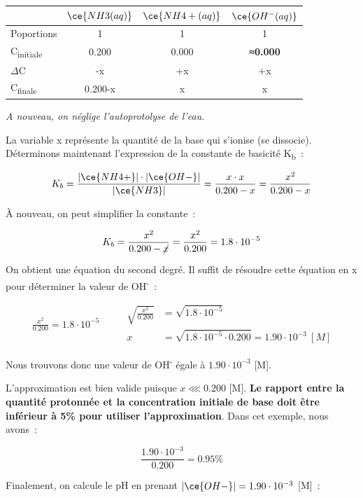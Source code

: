 \documentclass[
  11pt,
  a4paper,
  openany]{book}
\begin{document}
\begin{longtable}[]{@{}lccc@{}}
\toprule()
& \(\ce{NH3(aq)}\) & \(\ce{NH4+(aq)}\) & \(\ce{OH^{-}(aq)}\) \\
\midrule()
\endhead
Poportions & 1 & 1 & 1 \\
C\textsubscript{initiale} & 0.200 & 0.000 & \textbf{≈0.000} \\
\(\Delta\)C & -x & +x & +x \\
C\textsubscript{finale} & 0.200-x & x & x \\
\bottomrule()
\end{longtable}

\emph{A nouveau, on néglige l'autoprotolyse de l'eau.}

La variable x représente la quantité de la base qui s'ionise (se dissocie). Déterminons maintenant l'expression de la constante de basicité K\textsubscript{b}~:

\[
K_b = \frac{|\ce{NH4+}| \cdot |\ce{OH-}|}{|\ce{NH3}|} = \frac{x \cdot x}{0.200 - x} = \frac{x^2}{0.200 - x}
\]

À nouveau, on peut simplifier la constante~:

\[
K_b = \frac{x^2}{0.200 - \cancel{x}} = \frac{x^2}{0.200} = 1.8 \cdot 10^{-5}
\]

On obtient une équation du second degré. Il suffit de résoudre cette équation en x pour déterminer la valeur de \textbar OH\textsuperscript{-}\textbar~:

\[
\begin{split}
\frac{x^2}{0.200} = 1.8 \cdot 10^{-5}
\end{split}
\qquad
\begin{split}
\sqrt{\frac{x^2}{0.200}} &= \sqrt{1.8 \cdot 10^{-5}} \\
x &= \sqrt{1.8 \cdot 10^{-5} \cdot 0.200} = 1.90 \cdot 10^{-3}\ [M]
\end{split}
\]

Nous trouvons donc une valeur de \textbar OH\textsuperscript{-}\textbar{} égale à \(1.90 \cdot 10^{-3}\) {[}M{]}.

L'approximation est bien valide puisque \(x \lll 0.200\) {[}M{]}. \textbf{Le rapport entre la quantité protonnée et la concentration initiale de base doit être inférieur à 5\% pour utiliser l'approximation}. Dans cet exemple, nous avons~:

\[
\frac{1.90 \cdot 10^{-3}}{0.200} = 0.95\%
\]

Finalement, on calcule le pH en prenant \(|\ce{OH-}| = 1.90 \cdot 10^{-3}\) {[}M{]}~:
\end{document}
